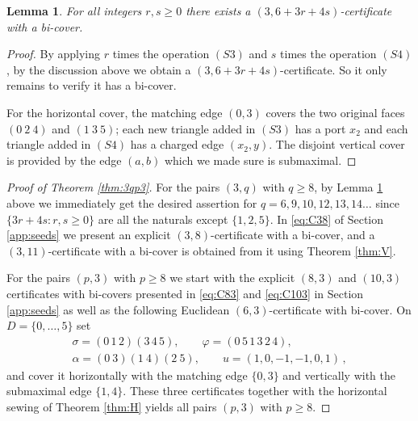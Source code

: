 \documentclass[11pt]{article}
\newtheorem{lemma}[theorem]{Lemma}
\theoremstyle{remark}
\begin{document}
\begin{lemma}\label{lem:p3semigroup}
For all integers $r,s\geq 0$ there exists a $(3,6+3r+4s)$-certificate with a bi-cover. 
\end{lemma}
\begin{proof} 
By applying $r$ times the operation $(S3)$ and $s$ times the operation $(S4)$, by the discussion above we obtain a $(3,6+3r+4s)$-certificate. So it only remains to verify it has a bi-cover. 
 
For the horizontal cover, the matching edge $(0,3)$ covers the two original faces $(0\ 2\ 4)$ and $(1\ 3\ 5)$; each new triangle added in $(S3)$ has a port $x_2$ and each triangle added in $(S4)$ has a charged edge $(x_2, y)$. The disjoint vertical cover is provided by the edge $(a,b)$ which we made sure is submaximal. 
\end{proof}


\begin{proof}[Proof of Theorem \ref{thm:3qp3}]
For the pairs $(3,q)$ with $q \geq 8$,
by Lemma \ref{lem:p3semigroup} above we immediately get the desired assertion for $q=6,9,10,12,13,14\ldots$ since $\{3r+4s:r,s\geq 0\}$ are all the naturals except $\{1,2,5\}$. In \eqref{eq:C38} of Section \ref{app:seeds} we present an explicit $(3,8)$-certificate with a bi-cover, and a $(3,11)$-certificate with a bi-cover is obtained from it using Theorem \ref{thm:V}.    

For the pairs $(p,3)$ with $p\geq 8$ we start with the explicit $(8,3)$ and $(10,3)$ certificates with bi-covers presented in \eqref{eq:C83} and \eqref{eq:C103} in Section \ref{app:seeds} as well as the following Euclidean $(6,3)$-certificate with bi-cover. On $D=\{0,\ldots,5\}$ set
\begin{equation}\label{eq:C63}
\begin{gathered}
 \sigma=(0\,1\,2)(3\,4\,5),\qquad
 \varphi=(0\,5\,1\,3\,2\,4),\\
 \alpha=(0\ 3)(1\ 4)(2\ 5),\qquad
 u=(1,0,-1,-1,0,1) \, ,
\end{gathered}
\end{equation}
and cover it horizontally with the matching edge $\{0,3\}$ and vertically with the submaximal edge $\{1,4\}$. These three certificates together with the horizontal sewing of Theorem \ref{thm:H} yields all pairs $(p,3)$ with $p \geq 8$.
\end{proof}
\end{document}
